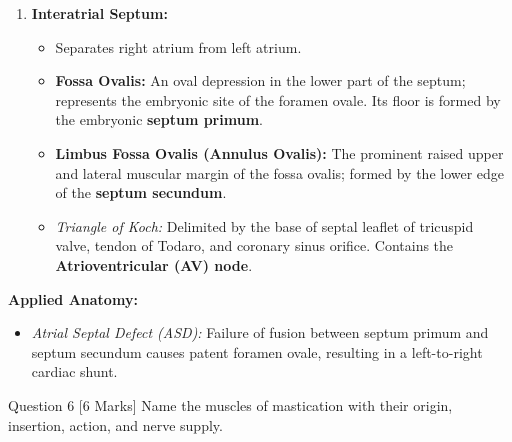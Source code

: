 \documentclass[11pt,a4paper]{article}
\begin{document}
\begin{ansbox}
\begin{enumerate}[leftmargin=*]
\begin{itemize}
        \item Corresponds externally to a shallow vertical groove called the \textbf{sulcus terminalis}.
        \item The \textbf{Sinoatrial (SA) node} is embedded in the upper part of crista terminalis immediately below the SVC opening.
    \end{itemize}
    \item \textbf{Interatrial Septum:}
    \begin{itemize}
        \item Separates right atrium from left atrium.
        \item \textbf{Fossa Ovalis:} An oval depression in the lower part of the septum; represents the embryonic site of the foramen ovale. Its floor is formed by the embryonic \textbf{septum primum}.
        \item \textbf{Limbus Fossa Ovalis (Annulus Ovalis):} The prominent raised upper and lateral muscular margin of the fossa ovalis; formed by the lower edge of the \textbf{septum secundum}.
        \item \textit{Triangle of Koch:} Delimited by the base of septal leaflet of tricuspid valve, tendon of Todaro, and coronary sinus orifice. Contains the \textbf{Atrioventricular (AV) node}.
    \end{itemize}
\end{enumerate}

\textbf{Applied Anatomy:}
\begin{itemize}[leftmargin=*]
    \item \textit{Atrial Septal Defect (ASD):} Failure of fusion between septum primum and septum secundum causes patent foramen ovale, resulting in a left-to-right cardiac shunt.
\end{itemize}
\end{ansbox}

\begin{qbox}{Question 6 [6 Marks]}
Name the muscles of mastication with their origin, insertion, action, and nerve supply.
\end{qbox}
\end{document}

